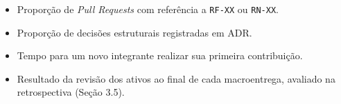 
\begin{itemize}
\item Proporção de \emph{Pull Requests} com referência a \texttt{RF-XX} ou \texttt{RN-XX}.
\item Proporção de decisões estruturais registradas em ADR.
\item Tempo para um novo integrante realizar sua primeira contribuição.
\item Resultado da revisão dos ativos ao final de cada macroentrega, avaliado na retrospectiva (Seção 3.5).
\end{itemize}

